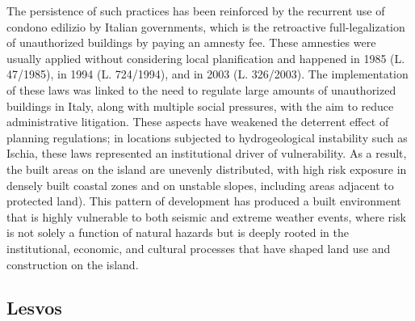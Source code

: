 \documentclass[10pt, twocolumn, twoside]{article}
\begin{document}
The persistence of such practices has been reinforced by the recurrent use of condono edilizio by Italian governments, which is the retroactive full-legalization of unauthorized buildings by paying an amnesty fee. These amnesties were usually applied without considering local planification and happened in 1985 (L. 47/1985), in 1994 (L. 724/1994), and in 2003 (L. 326/2003). The implementation of these laws was linked to the need to regulate large amounts of unauthorized buildings in Italy, along with multiple social pressures, with the aim to reduce administrative litigation. These aspects have weakened the deterrent effect of planning regulations; in locations subjected to hydrogeological instability such as Ischia, these laws represented an institutional driver of vulnerability. As a result, the built areas on the island are unevenly distributed, with high risk exposure in densely built coastal zones and on unstable slopes, including areas adjacent to protected land\cite{LeMonde2022Ischia}). This pattern of development has produced a built environment that is highly vulnerable to both seismic and extreme weather events, where risk is not solely a function of natural hazards but is deeply rooted in the institutional, economic, and cultural processes that have shaped land use and construction on the island.


\subsection{Lesvos}\label{sec_L}
\end{document}
